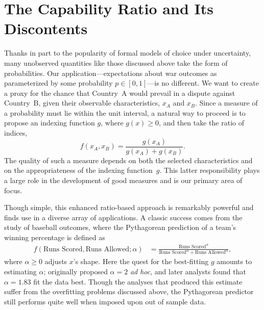 \section{The Capability Ratio and Its Discontents}

Thanks in part to the popularity of formal models of choice under uncertainty, many unobserved quantities like those discussed above take the form of probabilities.
Our application---expectations about war outcomes as parameterized by some probability $p \in [0,1]$---is no different.
We want to create a proxy for the chance that Country~A would prevail in a dispute against Country~B, given their observable characteristics, $x_A$ and $x_B$.
Since a measure of a probability must lie within the unit interval, a natural way to proceed is to propose an indexing function $g$, where $g(x) \geq 0$, and then take the ratio of indices,
\begin{equation}
  \label{eq:ratio}
  f(x_A, x_B)
  =
  \frac{g(x_A)}{g(x_A) + g(x_B)}.
\end{equation}
The quality of such a measure depends on both the selected characteristics and on the appropriateness of the indexing function~$g$.
This latter responsibility plays a large role in the development of good measures and is our primary area of focus.

Though simple, this enhanced ratio-based approach is remarkably powerful and finds use in a diverse array of applications.
A classic success comes from the study of baseball outcomes, where the Pythagorean prediction \citep{james1983,miller2007} of a team's winning percentage is defined as
\begin{align*}
  f\left(\text{Runs Scored}, \text{Runs Allowed} ; \alpha\right) &= \frac{\text{Runs Scored}^\alpha}{\text{Runs Scored}^\alpha + \text{Runs Allowed}^\alpha},
\end{align*}
where $\alpha \geq 0$ adjusts $x$'s shape.
Here the quest for the best-fitting $g$ amounts to estimating $\alpha$; \citet{james1983} originally proposed $\alpha = 2$ \emph{ad hoc}, and later analysts found that $\alpha = 1.83$ fit the data best.
Though the analyses that produced this estimate suffer from the overfitting problems discussed above, the Pythagorean predictor still performs quite well when imposed upon out of sample data.


